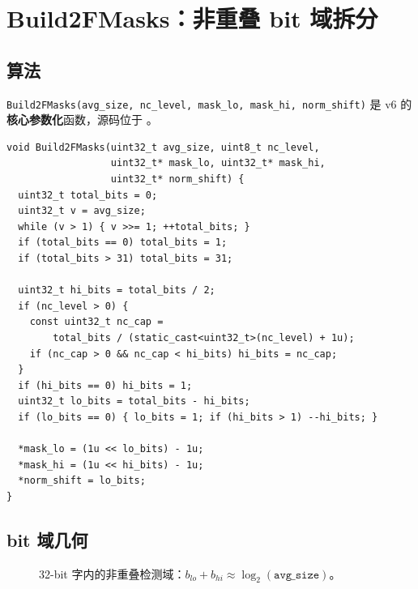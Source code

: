\chapter{Build2FMasks：非重叠 bit 域拆分}
\label{ch:build2fmasks}

\section{算法}

\texttt{Build2FMasks(avg\_size, nc\_level, mask\_lo, mask\_hi, norm\_shift)} 是 v6 的\textbf{核心参数化}函数，源码位于 。

\begin{lstlisting}[caption={Build2FMasks 完整实现},label={lst:build2fmasks}]
void Build2FMasks(uint32_t avg_size, uint8_t nc_level,
                  uint32_t* mask_lo, uint32_t* mask_hi,
                  uint32_t* norm_shift) {
  uint32_t total_bits = 0;
  uint32_t v = avg_size;
  while (v > 1) { v >>= 1; ++total_bits; }
  if (total_bits == 0) total_bits = 1;
  if (total_bits > 31) total_bits = 31;

  uint32_t hi_bits = total_bits / 2;
  if (nc_level > 0) {
    const uint32_t nc_cap =
        total_bits / (static_cast<uint32_t>(nc_level) + 1u);
    if (nc_cap > 0 && nc_cap < hi_bits) hi_bits = nc_cap;
  }
  if (hi_bits == 0) hi_bits = 1;
  uint32_t lo_bits = total_bits - hi_bits;
  if (lo_bits == 0) { lo_bits = 1; if (hi_bits > 1) --hi_bits; }

  *mask_lo = (1u << lo_bits) - 1u;
  *mask_hi = (1u << hi_bits) - 1u;
  *norm_shift = lo_bits;
}
\end{lstlisting}

\section{bit 域几何}

\begin{figure}[htbp]
\centering
{}
\caption{32-bit 字内的非重叠检测域：$b_{lo}+b_{hi} \approx \log_2(\texttt{avg\_size})$。}
\label{fig:bit-domains}
\end{figure}

